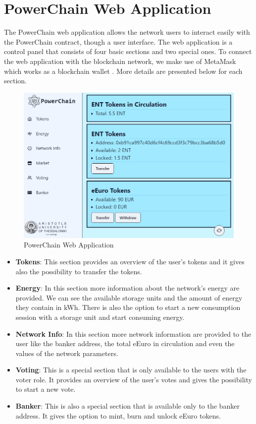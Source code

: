 \section{PowerChain Web Application}
The PowerChain web application allows the network users to interact easily with the PowerChain contract, though a user interface.
The web application is a control panel that consists of four basic sections and two special ones. To connect the web application with the blockchain network, we make use of MetaMask which works as a blockchain wallet \cite{metamask}.
More details are presented below for each section.
\begin{figure}[h!]
    \centering
    \includegraphics[width=\linewidth,frame,scale=1]{Figures/webapp.png}
    \caption{PowerChain Web Application}
\end{figure}
\begin{itemize}
    \item \textbf{Tokens}: This section provides an overview of the user's tokens and it gives also the possibility to transfer the tokens.
    \item \textbf{Energy}: In this section more information about the network's energy are provided. We can see the available storage units and the amount of energy they contain in kWh.
    There is also the option to start a new consumption session with a storage unit and start consuming energy.
    \item \textbf{Network Info}: In this section more network information are provided to the user like the banker address, the total eEuro in circulation and even the values of the network parameters.
    \item \textbf{Voting}: This is a special section that is only available to the users with the voter role. It provides an overview of the user's votes and gives the possibility to start a new vote.
    \item \textbf{Banker}: This is also a special section that is available only to the banker address. It gives the option to mint, burn and unlock eEuro tokens.
\end{itemize}

